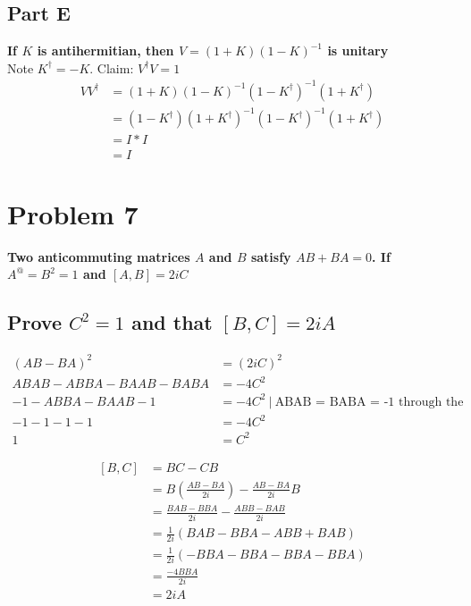 \documentclass[10pt,a4paper]{article}
\begin{document}
	
	\subsection{Part E}
	\textbf{If $K$ is antihermitian, then $V=(1+K)(1-K)^{-1}$ is unitary}\\
	Note $K^\dagger = -K$. Claim: $V^\dagger V=1$
	\begin{equation}
	\nonumber
		\begin{split}
			VV^\dagger &= (1+K)(1-K)^{-1}(1-K^\dagger)^{-1}(1+K^\dagger)\\
			&= (1-K^\dagger)(1+K^\dagger)^{-1}(1-K^\dagger)^{-1}(1+K^\dagger)\\
			&= I*I\\
			&= I
		\end{split}
	\end{equation}
	
	
	
	\section{Problem 7}
	\textbf{Two anticommuting matrices $A$ and $B$ satisfy $AB+BA=0$. If $A^@=B^2=1$ and $[A,B]=2iC$}
	\subsection{Prove $C^2=1$ and that $[B,C]=2iA$}
	\begin{equation}
	\nonumber
		\begin{split}
			(AB-BA)^2 &= (2iC)^2\\
			ABAB-ABBA-BAAB-BABA &= -4C^2\\
			-1 -ABBA - BAAB -1 &=  -4C^2 \ | \ \text{ABAB = BABA = -1 through the anticommuting property}\\
			-1 -1 -1 -1 &= -4C^2\\
			1 &= C^2
		\end{split}
	\end{equation}
	

	
	\begin{equation}
	\nonumber
		\begin{split}
			[B,C] &= BC-CB \\
			& = B(\frac{AB-BA}{2i})-\frac{AB-BA}{2i}B \\
			& = \frac{BAB-BBA}{2i} - \frac{ABB-BAB}{2i}\\
			&= \frac{1}{2i}(BAB-BBA-ABB+BAB)\\
			&= \frac{1}{2i}(-BBA-BBA-BBA-BBA)\\
			&= \frac{-4BBA}{2i}\\
			&= 2iA
		\end{split}
	\end{equation}
	
\end{document}
